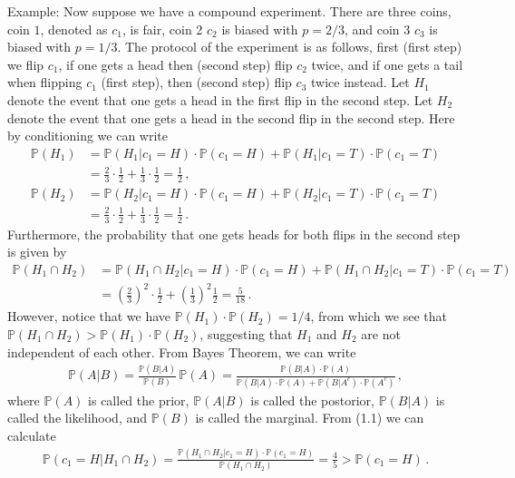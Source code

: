 \documentclass[11pt, onesided]{book}
\theoremstyle{break}
\theoremstyle{break}
\newcommand{\example}{\color{green}Example: \color{black}}
\begin{document}
\example Now suppose we have a compound experiment. There are three coins, coin $1$, denoted as $c_1$, is fair, coin 2 $c_2$ is biased with $p = 2/3$, and coin 3 $c_3$ is biased with $p = 1/3$. The protocol of the experiment is as follows, first (first step) we flip $c_1$, if one gets a head then (second step) flip $c_2$ twice, and if one gets a tail when flipping $c_1$ (first step), then (second step) flip $c_3$ twice instead. Let $H_1$ denote the event that one gets a head in the first flip in the second step. Let $H_2$ denote the event that one gets a head in the second flip in the second step. Here by conditioning we can write
\begin{align*}
\mathbb{P}(H_1) &= \mathbb{P}(H_1 | c_1 = H) \cdot \mathbb{P}(c_1 = H) + \mathbb{P}(H_1 |c_1 = T) \cdot \mathbb{P}(c_1 = T) \\
&= \frac{2}{3}\cdot \frac{1}{2} + \frac{1}{3}\cdot \frac{1}{2} = \frac{1}{2}\,,
\end{align*}
\begin{align*}
\mathbb{P}(H_2) &= \mathbb{P}(H_2 | c_1 = H) \cdot \mathbb{P}(c_1 = H) + \mathbb{P}(H_2 |c_1 = T) \cdot \mathbb{P}(c_1 = T) \\
&= \frac{2}{3}\cdot \frac{1}{2} + \frac{1}{3}\cdot \frac{1}{2} = \frac{1}{2}\,.
\end{align*}
Furthermore, the probability that one gets heads for both flips in the second step is given by
\begin{align*}
\mathbb{P}(H_1 \cap H_2) 
&= \mathbb{P}(H_1 \cap H_2 | c_1 = H) \cdot \mathbb{P}(c_1 = H) + \mathbb{P}(H_1 \cap H_2 | c_1 = T) \cdot \mathbb{P}(c_1 =T) \\
&= \left( \frac{2}{3}\right)^2 \cdot \frac{1}{2} + \left( \frac{1}{3}\right)^2 \frac{1}{2} = \frac{5}{18}\,.
\end{align*}
However, notice that we have $\mathbb{P}(H_1) \cdot \mathbb{P}(H_2) = 1/4$, from which we see that $\mathbb{P}(H_1 \cap H_2) > \mathbb{P}(H_1) \cdot \mathbb{P}(H_2)$, suggesting that $H_1$ and $H_2$ are not independent of each other. From Bayes Theorem, we can write
\begin{align}
\mathbb{P}(A|B) = \frac{\mathbb{P}(B|A)}{\mathbb{P}(B)}\, \mathbb{P}(A) = \frac{\mathbb{P}(B|A)\cdot \mathbb{P}(A)}{\mathbb{P}(B|A) \cdot \mathbb{P}(A) + \mathbb{P}(B|A^c) \cdot \mathbb{P}(A^c)}\,,
\end{align}
where $\mathbb{P}(A)$ is called the prior, $\mathbb{P}(A|B)$ is called the postorior, $\mathbb{P}(B|A)$ is called the likelihood, and $\mathbb{P}(B)$ is called the marginal. From (1.1) we can calculate
\begin{align*}
\mathbb{P}(c_1 = H |H_1 \cap H_2) = \frac{\mathbb{P}(H_1 \cap H_2 | c_1  = H) \cdot \mathbb{P}(c_1 = H)}{\mathbb{P}(H_1 \cap H_2)} = \frac{4}{5} > \mathbb{P}(c_1 = H)\,.
\end{align*}
\end{document}

